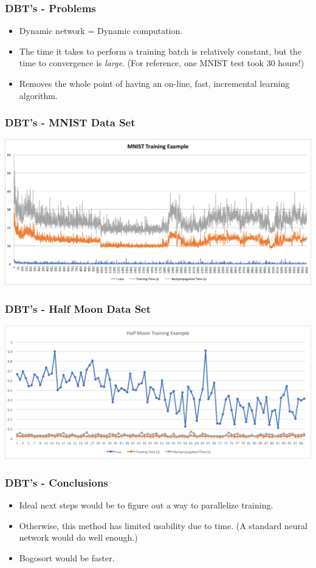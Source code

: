 \documentclass[pdf]{beamer}
\begin{document}
\begin{frame}
\frametitle{DBT's -  Problems}
\begin{itemize}
	\item Dynamic network = Dynamic computation.
	\item The time it takes to perform a training batch is relatively constant, but the time to convergence is \textit{large}. (For reference, one MNIST test took 30 hours!)
	\item Removes the whole point of having an on-line, fast, incremental learning algorithm. 
\end{itemize}
\end{frame}
\begin{frame}
\frametitle{DBT's -  MNIST Data Set}
	\includegraphics[scale=0.36]{./Graphics/mnist1}
\end{frame}

\begin{frame}
\frametitle{DBT's -  Half Moon Data Set}
	\includegraphics[scale=0.4]{./Graphics/HalfMoon1}
\end{frame}

\begin{frame}
	\frametitle{DBT's - Conclusions}
	\begin{itemize}
		\item Ideal next steps would be to figure out a way to parallelize training. 
		\item Otherwise, this method has limited usability due to time. (A standard neural network would do well enough.)
		\item Bogosort would be faster. 
	\end{itemize}
\end{frame}
\end{document}
